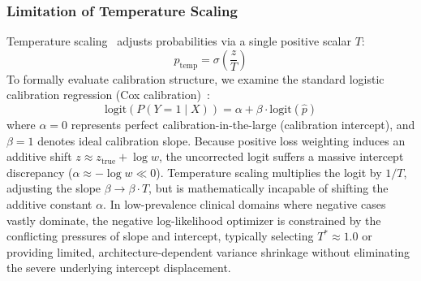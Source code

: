 \documentclass[preprint,12pt]{elsarticle}
\begin{document}
\subsubsection{Limitation of Temperature Scaling}
Temperature scaling~\cite{guo2017calibration} adjusts probabilities via a single positive scalar $T$:
\begin{equation}
p_{\text{temp}} = \sigma\left(\frac{z}{T}\right)
\end{equation}
To formally evaluate calibration structure, we examine the standard logistic calibration regression (Cox calibration)~\cite{vancalster2019calibration, steyerberg2010assessing}:
\begin{equation}
\text{logit}(P(Y = 1 \mid X)) = \alpha + \beta \cdot \text{logit}(\hat{p})
\label{eq:cox_calibration}
\end{equation}
where $\alpha = 0$ represents perfect calibration-in-the-large (calibration intercept), and $\beta = 1$ denotes ideal calibration slope. Because positive loss weighting induces an additive shift $z \approx z_{\text{true}} + \log w$, the uncorrected logit suffers a massive intercept discrepancy ($\alpha \approx -\log w \ll 0$). Temperature scaling multiplies the logit by $1/T$, adjusting the slope $\beta \to \beta \cdot T$, but is mathematically incapable of shifting the additive constant $\alpha$. In low-prevalence clinical domains where negative cases vastly dominate, the negative log-likelihood optimizer is constrained by the conflicting pressures of slope and intercept, typically selecting $T^* \approx 1.0$ or providing limited, architecture-dependent variance shrinkage without eliminating the severe underlying intercept displacement.
\end{document}
